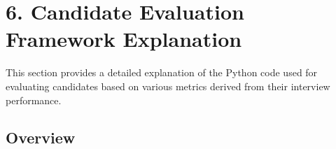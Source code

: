 \documentclass{article}
\begin{document}










\newpage

\section{6. Candidate Evaluation Framework Explanation}

This section provides a detailed explanation of the Python code used for evaluating candidates based on various metrics derived from their interview performance.

\subsection{Overview}
\end{document}
